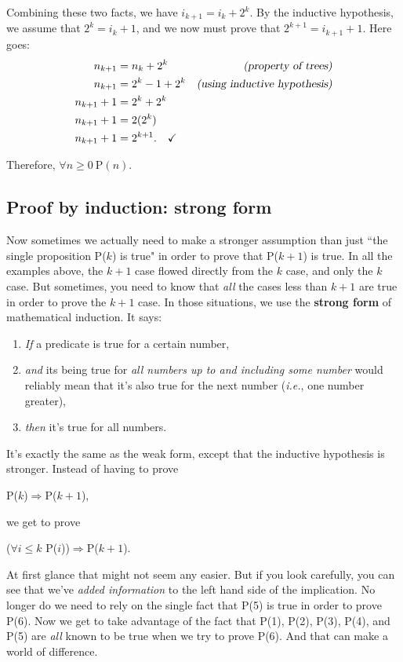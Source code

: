\begin{enumerate}
Combining these two facts, we have $i_{k+1} = i_k + 2^k$. By the inductive
hypothesis, we assume that $2^k = i_k + 1$, and we now must prove that
$2^{k+1} = i_{k+1} + 1$. Here goes:
\begin{align*}
n_{k+1} &= n_k + 2^k &\textsl{(property of trees)} \\
n_{k+1} &= 2^k - 1 + 2^k &\textsl{(using inductive hypothesis)} \\
n_{k+1} + 1 &= 2^k + 2^k \\
n_{k+1} + 1 &= 2(2^k) \\
n_{k+1} + 1 &= 2^{k+1}. \quad \checkmark
\end{align*}

\end{enumerate}

Therefore, $\forall n\geq0 \ \text{P}(n)$.


\subsection{Proof by induction: strong form}

Now sometimes we actually need to make a stronger assumption than just
``the single proposition P($k$) is true" in order to prove that P($k+1$) is
true. In all the examples above, the $k+1$ case flowed directly from the
$k$ case, and only the $k$ case. But sometimes, you need to know that
\textit{all} the cases less than $k+1$ are true in order to prove the $k+1$
case. In those situations, we use the \textbf{strong form} of mathematical
induction. It says:

\begin{enumerate}
\item \label{basecasestrong} \textit{If} a predicate is true for a certain number,
\item \label{inductivestepstrong} \textit{and} its being true for \textit{all
numbers up to and including some number} would reliably mean that it's also
true for the next number (\textit{i.e.}, one number greater), 
\item \textit{then} it's true for all numbers.
\end{enumerate}
It's exactly the same as the weak form, except that the inductive
hypothesis is stronger. Instead of having to prove
\begin{center}
P($k$)$\Rightarrow$P($k+1$),
\end{center}
we get to prove
\begin{center}
($\forall i\leq k$ P($i$))$\Rightarrow$P($k+1$).
\end{center}
At first glance that might not seem any easier. But if you look carefully,
you can see that we've \textit{added information} to the left hand side of
the implication.  No longer do we need to rely on the single fact that P(5)
is true in order to prove P(6). Now we get to take advantage of the fact
that P(1), P(2), P(3), P(4), and P(5) are \textit{all} known to be true
when we try to prove P(6). And that can make a world of difference.


